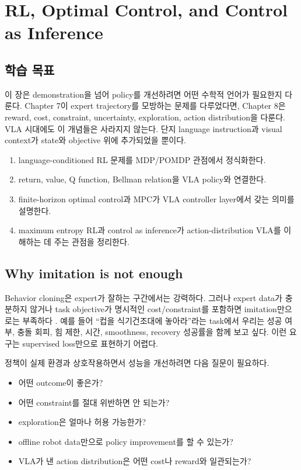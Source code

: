 \chapter{RL, Optimal Control, and Control as Inference}

\section*{학습 목표}

이 장은 demonstration을 넘어 policy를 개선하려면 어떤 수학적 언어가 필요한지 다룬다. Chapter 7이 expert trajectory를 모방하는 문제를 다루었다면, Chapter 8은 reward, cost, constraint, uncertainty, exploration, action distribution을 다룬다. VLA 시대에도 이 개념들은 사라지지 않는다. 단지 language instruction과 visual context가 state와 objective 위에 추가되었을 뿐이다.

\begin{enumerate}
  \item language-conditioned RL 문제를 MDP/POMDP 관점에서 정식화한다.
  \item return, value, Q function, Bellman relation을 VLA policy와 연결한다.
  \item finite-horizon optimal control과 MPC가 VLA controller layer에서 갖는 의미를 설명한다.
  \item maximum entropy RL과 control as inference가 action-distribution VLA를 이해하는 데 주는 관점을 정리한다.
\end{enumerate}

\section{Why imitation is not enough}

Behavior cloning은 expert가 잘하는 구간에서는 강력하다. 그러나 expert data가 충분하지 않거나 task objective가 명시적인 cost/constraint를 포함하면 imitation만으로는 부족하다 \cite{sutton2018,haarnoja2018sac,kumar2020cql}. 예를 들어 ``컵을 식기건조대에 놓아라''라는 task에서 우리는 성공 여부, 충돌 회피, 힘 제한, 시간, smoothness, recovery 성공률을 함께 보고 싶다. 이런 요구는 supervised loss만으로 표현하기 어렵다.

정책이 실제 환경과 상호작용하면서 성능을 개선하려면 다음 질문이 필요하다.

\begin{itemize}
  \item 어떤 outcome이 좋은가?
  \item 어떤 constraint를 절대 위반하면 안 되는가?
  \item exploration은 얼마나 허용 가능한가?
  \item offline robot data만으로 policy improvement를 할 수 있는가?
  \item VLA가 낸 action distribution은 어떤 cost나 reward와 일관되는가?
\end{itemize}


